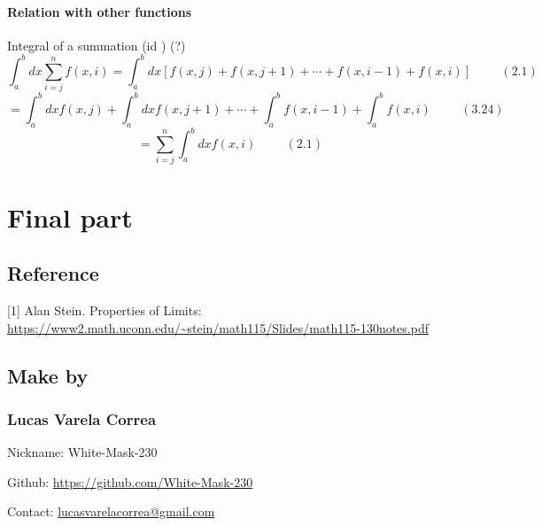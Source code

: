 \documentclass{book}
\begin{document}
                \subsubsection{Relation with other functions}
                    Integral of a summation (id \IntegralSummation) (?)
                    \[\int^b_a dx \sum^n_{i=j} f(x, i) = \int^b_a dx [f(x, j) + f(x, j + 1) + \cdots + f(x, i - 1) + f(x, i)] \hspace{1cm} (2.1)\]
                    \[= \int^b_a dx f(x, j) + \int^b_a dx f(x, j + 1) + \cdots + \int^b_a f(x, i - 1) + \int^b_a f(x, i) \hspace{1cm} (3.24)\]
                    \[= \sum^n_{i=j} \int^b_a dx f(x, i) \hspace{1cm} (2.1)\]

        \chapter{Final part}
            \section{Reference}
                [1] Alan Stein. Properties of Limits: \url{https://www2.math.uconn.edu/~stein/math115/Slides/math115-130notes.pdf}

            \section{Make by}
                \subsection*{Lucas Varela Correa}
                    Nickname: White-Mask-230
                    
                    Github: \url{https://github.com/White-Mask-230}

                    Contact: \url{lucasvarelacorrea@gmail.com}
\end{document}
